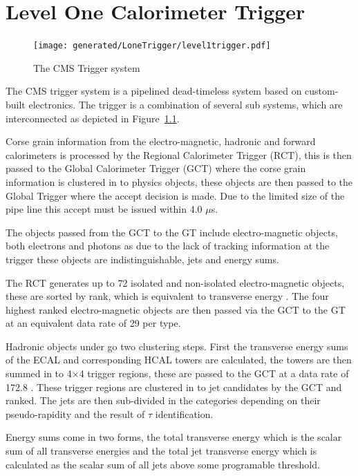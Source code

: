 \chapter{Level One Calorimeter Trigger} %
\label{cha:level_one_trigger}
\begin{figure}[ht]
  \centering
    \texttt{[image: generated/LoneTrigger/level1trigger.pdf]}
  \caption{The CMS \Lone Trigger system}
  \label{fig:figures_LoneTrigger_level1trigger}
\end{figure}


The CMS \Lone trigger system\cite{l1} is a pipelined dead-timeless system based 
on custom-built electronics.
The \Lone trigger is a combination of several sub systems, which are 
interconnected as depicted in 
Figure~\ref{fig:figures_LoneTrigger_level1trigger}.

Corse grain information from the electro-magnetic, hadronic and forward 
calorimeters is processed by the Regional Calorimeter
Trigger (RCT), this is then passed to the Global Calorimeter Trigger (GCT) 
where the corse grain information is clustered in to
physics objects, these objects are then passed to the Global Trigger where the 
\Lone accept decision is made. Due to the limited
size of the pipe line this \Lone accept must be issued within 4.0 $\mu$s.

The objects passed from the GCT to the GT include electro-magnetic objects, 
both electrons and photons as due to the lack of
tracking information at the \Lone trigger these objects are indistinguishable, 
jets and energy sums.

The RCT generates up to 72 isolated and non-isolated electro-magnetic objects, 
these are sorted by rank, which is equivalent to
transverse energy \ET. The four highest ranked electro-magnetic objects are 
then passed via the GCT to the GT at an equivalent data 
rate of 29 \Gbs per type.

Hadronic objects under go two clustering steps. First the transverse energy 
sums of the ECAL and corresponding HCAL towers are
calculated, the towers are then summed in to 4$\times$4 trigger regions, these 
are passed to the GCT at a data rate of 172.8 \Gbs.
These trigger regions are clustered in to jet candidates by the GCT and ranked. 
The jets are then sub-divided in the 
categories depending on their pseudo-rapidity and the result of $\tau$ 
identification. 

Energy sums come in two forms, the total transverse energy \ET which is the 
scalar sum of all transverse energies and the total 
jet transverse energy \HT which is calculated as the scalar sum of all jets 
above some programable threshold.

